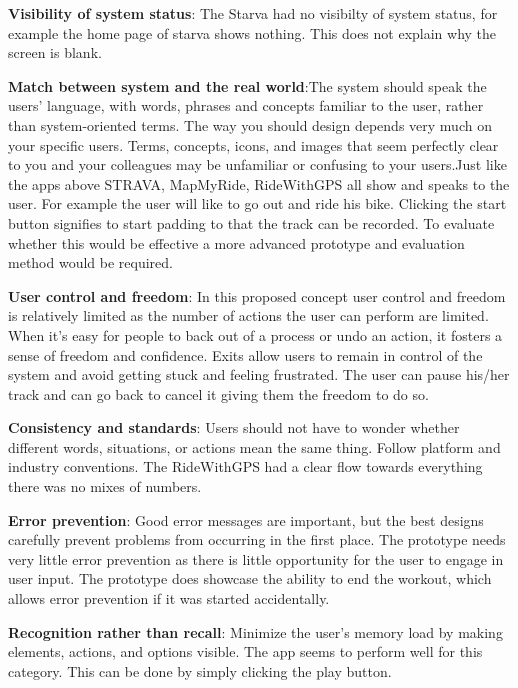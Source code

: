 \documentclass{l4proj}
\begin{document}
\textbf{Visibility of system status}: The Starva had no  visibilty of system status, for example the home page of starva shows  nothing. This does not explain why the screen is blank.





\textbf{Match between system and the real world}:The system should speak the users' language, with words, phrases and concepts familiar to the user, rather than system-oriented terms. The way you should design depends very much on your specific users. Terms, concepts, icons, and images that seem perfectly clear to you and your colleagues may be unfamiliar or confusing to your users.Just like the apps above STRAVA, MapMyRide, RideWithGPS all show and speaks to the user. For example the user will like to go out and ride his bike. Clicking the start button signifies to start padding to that the track can be recorded. To evaluate whether this would be effective a more advanced prototype and evaluation method would be required.  

\textbf{User control and freedom}: In this proposed concept user control and freedom is relatively limited as the number of actions the user can perform are limited. When it's easy for people to back out of a process or undo an action, it fosters a sense of freedom and confidence. Exits allow users to remain in control of the system and avoid getting stuck and feeling frustrated. The user can pause his/her track and can go back to cancel it giving them the freedom to do so.

\textbf{Consistency and standards}: Users should not have to wonder whether different words, situations, or actions mean the same thing. Follow platform and industry conventions. The RideWithGPS had a clear flow towards everything there was no mixes of numbers. 
 

\textbf{Error prevention}: Good error messages are important, but the best designs carefully prevent problems from occurring in the first place. The prototype needs very little error prevention as there is little opportunity for the user to engage in user input. The prototype does showcase the ability to end the workout, which allows error prevention if it was started accidentally. 

\textbf{Recognition rather than recall}: Minimize the user's memory load by making elements, actions, and options visible. The app seems to perform well for this category. This can be done by simply clicking the play button. 
\end{document}
